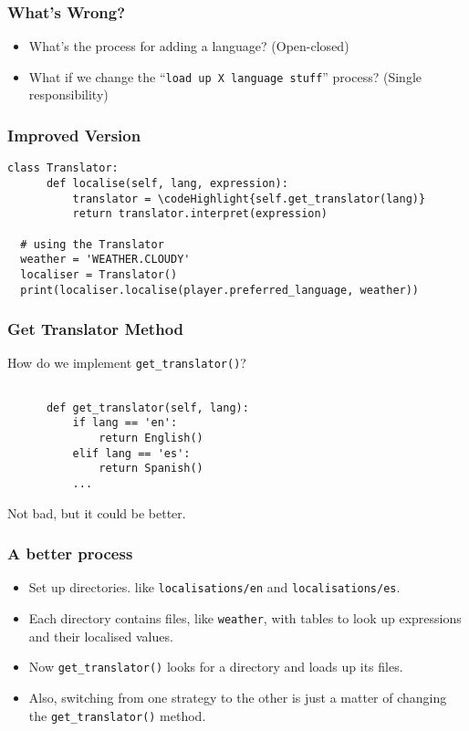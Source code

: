 \documentclass[10pt]{beamer}
\newcommand\codeHighlight[1]{\textcolor[rgb]{1,0,0}{\textbf{#1}}}
\begin{document}
\begin{frame}
  \frametitle{What's Wrong?}

  \begin{itemize}
    \item What's the process for adding a language? (Open-closed)
    \item What if we change the ``\texttt{load up X language stuff}'' process? (Single responsibility)
  \end{itemize}
 \end{frame} 


\begin{frame}[fragile]
  \frametitle{Improved Version}

  
  \begin{Verbatim}[commandchars=\\\{\}]
  class Translator:
      def localise(self, lang, expression):
          translator = \codeHighlight{self.get_translator(lang)}
          return translator.interpret(expression)
          
  # using the Translator
  weather = 'WEATHER.CLOUDY'
  localiser = Translator()
  print(localiser.localise(player.preferred_language, weather))        

  \end{Verbatim}
 \end{frame} 

\begin{frame}[fragile]
  \frametitle{Get Translator Method}

  How do we implement \texttt{get\_translator()}?

  \begin{verbatim}
  
      def get_translator(self, lang):
          if lang == 'en':
              return English()
          elif lang == 'es':
              return Spanish() 
          ...                  
  \end{verbatim}
  Not bad, but it could be better.
 \end{frame} 
 
\begin{frame}
  \frametitle{A better process}
  
  \begin{itemize}
    \item Set up directories. like \texttt{localisations/en} and \texttt{localisations/es}.
    \item Each directory contains files, like \texttt{weather}, with tables to look up expressions and their localised values.
    \item Now \texttt{get\_translator()} looks for a directory and loads up its files.
    \item Also, switching from one strategy to the other is just a matter of changing the \texttt{get\_translator()} method.
  \end{itemize}      
\end{frame}
\end{document}
